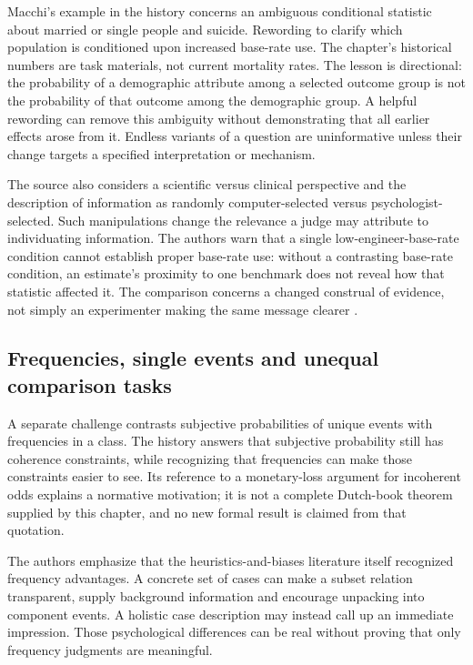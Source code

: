 Macchi's example in the history concerns an ambiguous conditional statistic
about married or single people and suicide. Rewording to clarify which
population is conditioned upon increased base-rate use. The chapter's
historical numbers are task materials, not current mortality rates.
The lesson is directional: the probability of a demographic attribute
among a selected outcome group is not the probability of that outcome
among the demographic group. A helpful rewording can remove this ambiguity
without demonstrating that all earlier effects arose from it. Endless
variants of a question are uninformative unless their change targets
a specified interpretation or mechanism.

The source also considers a scientific versus clinical perspective and
the description of information as randomly computer-selected versus
psychologist-selected. Such manipulations change the relevance a judge
may attribute to individuating information. The authors warn that a
single low-engineer-base-rate condition cannot establish proper base-rate
use: without a contrasting base-rate condition, an estimate's proximity
to one benchmark does not reveal how that statistic affected it. The
comparison concerns a changed construal of evidence, not simply an
experimenter making the same message clearer
\cite[pp.~334--335]{GriffinEtAl2012HeuristicsHistory}.

\subsection{Frequencies, single events and unequal comparison tasks}

A separate challenge contrasts subjective probabilities of unique events
with frequencies in a class. The history answers that subjective probability
still has coherence constraints, while recognizing that frequencies can
make those constraints easier to see. Its reference to a monetary-loss
argument for incoherent odds explains a normative motivation; it is not
a complete Dutch-book theorem supplied by this chapter, and no new
formal result is claimed from that quotation.

The authors emphasize that the heuristics-and-biases literature itself
recognized frequency advantages. A concrete set of cases can make a
subset relation transparent, supply background information and encourage
unpacking into component events. A holistic case description may instead
call up an immediate impression. Those psychological differences can be
real without proving that only frequency judgments are meaningful.

